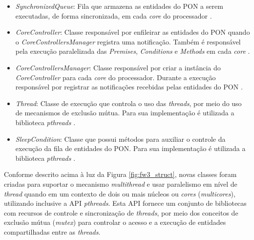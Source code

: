 \begin{itemize}
  \item \textit{SynchronizedQueue}: Fila que armazena as entidades do PON a
        serem executadas, de forma sincronizada, em cada \textit{core} do
        processador \cite{belmonte_2012,schutz_2018}.
  \item \textit{CoreController}: Classe responsável por enfileirar as entidades
        do PON quando o \textit{CoreControllersManager} registra uma
        notificação. Também é responsável pela execução paralelizada das
        \textit{Premises}, \textit{Conditions} e \textit{Methods} em cada
        \textit{core} \cite{belmonte_2012,schutz_2018}.
  \item \textit{CoreControllersManager}: Classe responsável por criar a
        instância do \textit{CoreController} para cada \textit{core} do
        processador. Durante a execução responsável por registrar as
        notificações recebidas pelas entidades do PON \cite{belmonte_2012,schutz_2018}.
  \item \textit{Thread}: Classe de execução que controla o uso das
        \textit{threads}, por meio do uso de mecanismos de exclusão mútua. Para
        sua implementação é utilizada a biblioteca \textit{pthreads}
        \cite{belmonte_2012,schutz_2018}.
  \item \textit{SleepCondition}: Classe que possui métodos para auxiliar o
        controle da execução da fila de entidades do PON. Para sua implementação
        é utilizada a biblioteca \textit{pthreads} \cite{belmonte_2012,schutz_2018}.
\end{itemize}

Conforme descrito acima à luz da Figura \ref{fig:fw3_struct}, novas classes
foram criadas para suportar o mecanismo \textit{multithread} e usar paralelismo
em nível de \textit{thread} quando em um contexto de dois ou mais núcleos ou
\textit{cores} (\textit{multicores}), utilizando inclusive a API \textit{pthreads}. Esta
API fornece um conjunto de bibliotecas com recursos de controle e sincronização
de \textit{threads}, por meio dos conceitos de exclusão mútua (\textit{mutex})
para controlar o acesso e a execução de entidades compartilhadas entre as
\textit{threads}.


